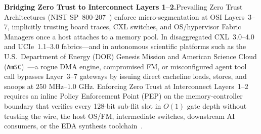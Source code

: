\documentclass[11pt,letterpaper]{article}
\theoremstyle{spectralthm}
\begin{document}
\noindent\textbf{Bridging Zero Trust to Interconnect Layers 1--2.}\;Prevailing Zero Trust Architectures (NIST SP~800-207~\cite{rose2020zta}) enforce micro-segmentation at OSI Layers~3--7, implicitly trusting board traces, CXL switches, and OS/hypervisor Fabric Managers once a host attaches to a memory pool. In disaggregated \mbox{CXL~3.0--4.0} and \mbox{UCIe~1.1--3.0} fabrics---and in autonomous scientific platforms such as the U.S.\ Department of Energy (DOE) Genesis Mission and American Science Cloud (\texttt{AmSC})~\cite{doe2025genesis}---a rogue DMA engine, compromised FM, or misconfigured agent tool call bypasses Layer~3--7 gateways by issuing direct cacheline loads, stores, and snoops at $250\text{~MHz}$--$1.0\text{~GHz}$. Enforcing Zero Trust at Interconnect Layers~1--2 requires an inline Policy Enforcement Point (PEP) on the memory-controller boundary that verifies every 128-bit sub-flit slot in $O(1)$ gate depth without trusting the wire, the host OS/FM, intermediate switches, downstream AI consumers, or the EDA synthesis toolchain~\cite{mitra2000commonmode, ncdsmo2020rain}.
\end{document}
